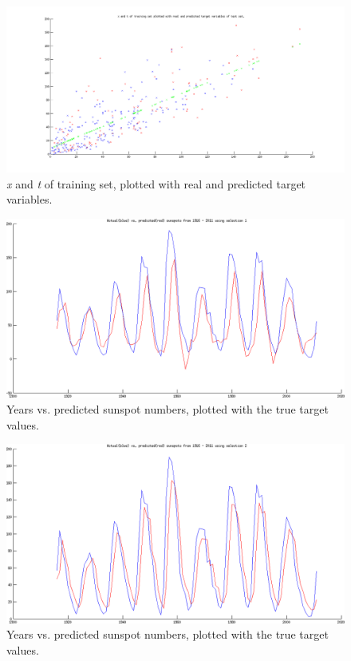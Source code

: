 \FloatBarrier
\begin{figure}[h!]
	\includegraphics[width=\linewidth]{img/II_2_1_xt.png}
    \caption{\textit{x} and \textit{t} of training set, plotted 
    with real and predicted target variables.\label{fig:II_2_1_xt}}
\end{figure}

\begin{figure}[!ht]
	\includegraphics[width=\linewidth]{img/II_2_1_sel1.png}
    \caption{Years vs. predicted sunspot numbers, plotted with
    the true target values.\label{fig:II_2_1_sel1}}
\end{figure}

\begin{figure}[!ht]
	\includegraphics[width=\linewidth]{img/II_2_1_sel2.png}
    \caption{Years vs. predicted sunspot numbers, plotted with
    the true target values.\label{fig:II_2_1_sel2}}
\end{figure}

